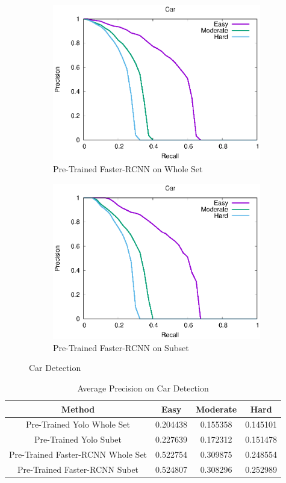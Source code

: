 \begin{figure}[h!]
\begin{subfigure}[t]{.24\textwidth}
    \includegraphics[width=1.0\linewidth]{img/FRCNN_Nov_8/plot_valid/car_detection.eps}
    \caption{Pre-Trained Faster-RCNN on Whole Set}
\end{subfigure}
\begin{subfigure}[t]{.24\textwidth}
    \centering
    \includegraphics[width=1.0\linewidth]{img/FRCNN_Nov_8/plot_valid_30/car_detection.eps}
    \caption{Pre-Trained Faster-RCNN on Subset}
\end{subfigure}
\caption{Car Detection}
\end{figure}

\begin{table}[h!]
\centering
\begin{tabular}{ c | c | c | c }
\hline
Method & Easy & Moderate & Hard \\
\hline \hline
Pre-Trained Yolo Whole Set & 0.204438 & 0.155358 & 0.145101 \\
Pre-Trained Yolo Subet & 0.227639 & 0.172312 & 0.151478 \\
Pre-Trained Faster-RCNN Whole Set & 0.522754 & 0.309875 & 0.248554 \\
Pre-Trained Faster-RCNN Subet & 0.524807 & 0.308296 & 0.252989 \\
\hline
\end{tabular}
\caption{Average Precision on Car Detection}
\end{table}


